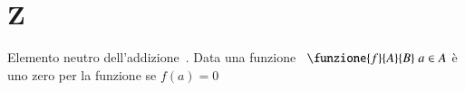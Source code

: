 \chapter{Z}
\vspace{5mm}
Elemento neutro dell'addizione\pointsto~.
Data una funzione\pointsto~ $\funzione{f}{A}{B}\;a\in A$ è uno zero per la funzione se $f(a)=0$